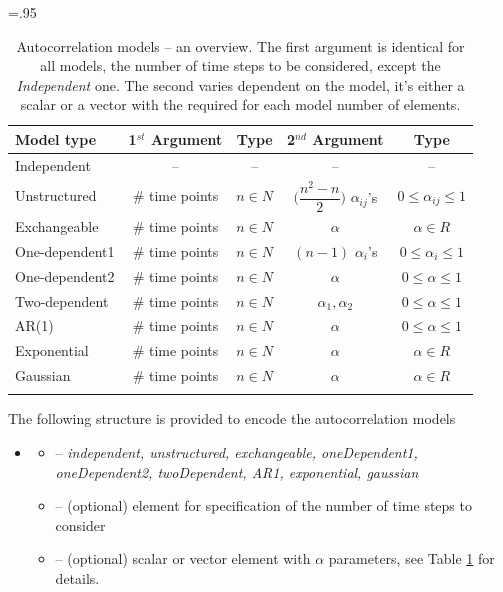 \captionsetup[longtable]{skip=.5em}
\LTcapwidth=.95\textwidth
\begin{center}
\setlength{\tabcolsep}{7.5pt}
\renewcommand{\arraystretch}{1.1}%
\begin{longtable}{l | cc | cc}
  \hline
  \hline
	\textbf{Model type} 	& \textbf{1$^{st}$ Argument} 	& Type	& \textbf{2$^{nd}$ Argument}  		& Type	\\
  \hline
  \hline
Independent			& --				& -- 			&  -- 							& -- \\
Unstructured			& \# time points		& $n\in N$ 	&  \Gape[.4cm][0cm]{} $\Big(\dfrac{n^2-n}{2}\Big)$ $\alpha_{ij}$'s 	& $0 \leq \alpha_{ij} \leq 1$ \\
Exchangeable			& \# time points		& $n\in N$ 	& $\alpha$ 					& $\alpha \in R$ \\
One-dependent1		& \# time points		& $n\in N$ 	& $(n-1)$ $\alpha_i$'s 			& $0 \leq \alpha_i \leq 1$ \\
One-dependent2		& \# time points		& $n\in N$ 	& $\alpha$ 					& $0 \leq \alpha \leq 1$ \\
Two-dependent		& \# time points		& $n\in N$ 	& $\alpha_1, \alpha_2$ 			& $0 \leq \alpha \leq 1$ \\
AR(1)				& \# time points		& $n\in N$ 	& $\alpha$ 					& $0 \leq \alpha \leq 1$ \\
Exponential			& \# time points		& $n\in N$ 	& $\alpha$ 					& $\alpha \in R$ \\
Gaussian				& \# time points		& $n\in N$ 	& $\alpha$ 					& $\alpha \in R$ \\
   \hline
\caption{Autocorrelation models -- an overview. The first argument is 
identical for all models, the number of time steps to be considered, except the 
\textit{Independent} one. The second varies dependent on the model, it's either 
a scalar or a vector with the required for each model number of elements.}
\label{tab:autoCorr}
\end{longtable}
\end{center}

The following structure is provided to encode the autocorrelation models

\begin{itemize}
\item 
{}
\begin{itemize}
\item 
{}	 -- \textit{independent, unstructured, exchangeable, oneDependent1, 
oneDependent2, twoDependent, AR1, exponential, gaussian}
\item 
{} -- (optional) element for specification of the number of time steps to consider	
\item
{} -- (optional) scalar or vector element with $\alpha$ parameters, see Table \ref{tab:autoCorr} for details. 
\end{itemize}
\end{itemize}

